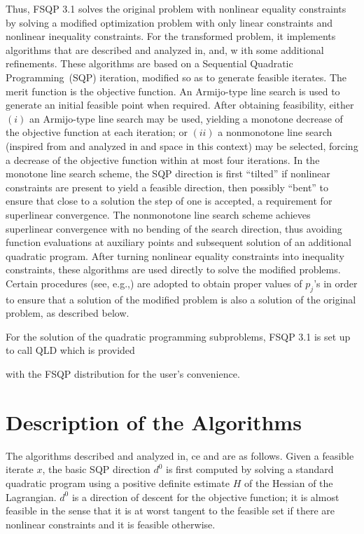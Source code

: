 Thus, FSQP 3.1 solves the original problem with nonlinear equality constraints
by solving a modified optimization problem with only linear constraints 
and nonlinear inequality constraints.  For the transformed problem,
it implements algorithms that are described 
and analyzed in\Lspace {}\Rcitemark \Rspace{},
\Rcitemark \Rspace{} and\Lspace {}\Rcitemark \Rspace{}, w
ith some additional refinements.
These algorithms are based on a Sequential Quadratic Programming~(SQP)
iteration, modified so as to generate feasible iterates. 
The merit function is the objective function. 
An Armijo-type line search is used to generate an initial feasible point 
when required.
After obtaining feasibility, either $(i)$ an Armijo-type line
search may be used, yielding a monotone decrease of the 
objective function at each iteration\Lspace {}\Rcitemark \Rspace{}; 
or $(ii)$ a nonmonotone line 
search (inspired from\Lspace {}\Rcitemark \Rspace{} and analyzed
in\Lspace {}\Rcitemark \Rspace{} and\Lspace {}\Rcitemark \R
space{} in this context)
may be selected, forcing a decrease of 
the objective function within at most four iterations.
In the monotone line search scheme, the SQP direction is first 
``tilted'' if nonlinear constraints are present
to yield a feasible direction, then possibly ``bent'' to ensure 
that close to a solution the step of one is accepted, 
a requirement for superlinear convergence.
The nonmonotone line search scheme achieves superlinear convergence 
with no bending of the search direction, thus avoiding function 
evaluations at auxiliary points and subsequent solution of 
an additional quadratic program. After turning nonlinear equality
constraints into inequality constraints, these algorithms are
used directly to solve the modified problems. Certain procedures
(see, e.g.,\Lspace {}\Rcitemark \Rspace{})
are adopted to obtain proper values of $p_j$'s in order to
ensure that a solution of the modified problem is also a solution
of the original problem, as described below.

For the solution of the quadratic programming subproblems, FSQP 3.1
is set up to call QLD\Lspace {}\Rcitemark \Rspace{} which is provided
 
with the FSQP distribution for the user's convenience.

\section{Description of the Algorithms}
The algorithms described and analyzed 
in\Lspace {}\Rcitemark \Rspace{},\Lspace {}\Rcitemark \Rspa
ce{} 
and\Lspace {}\Rcitemark \Rspace{} are as follows.
Given a feasible iterate $x$, the basic SQP direction
$d^0$ is first computed by solving a standard quadratic program 
using a positive definite estimate $H$ of 
the Hessian of the Lagrangian. 
$d^0$ is a direction of descent for the objective function; it is 
almost feasible in the sense that it is at worst tangent to 
the feasible set if there are nonlinear constraints and it is feasible 
otherwise.

